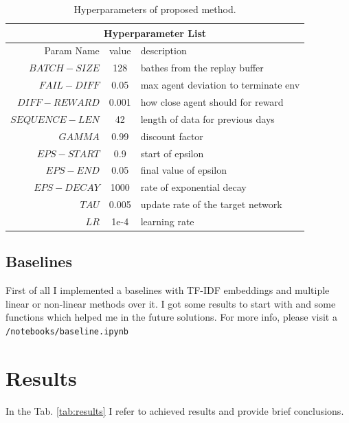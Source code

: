\documentclass{article}
\begin{document}
\begin{table}[tbh!]
\begin{center}
\begin{tabular}{ |r||c|l|  }
 \hline
 \multicolumn{3}{|c|}{Hyperparameter List} \\
 \hline
 Param Name & value & description \\
 \hline
 $BATCH-SIZE$   & 128    & bathes from the replay buffer\\
 $FAIL-DIFF$ & 0.05 & max agent deviation to terminate env\\ 
 $DIFF-REWARD$ & 0.001 & how close agent should for reward\\
 $SEQUENCE-LEN$ & 42 & length of data for previous days  \\
 $GAMMA$   & 0.99    & discount factor\\
 $EPS-START$ & 0.9    & start of epsilon\\
 $EPS-END$ &  0.05    & final value of epsilon\\
 $EPS-DECAY$ &  1000    & rate of exponential decay\\
 $TAU$ &  0.005    &update rate of the target network\\
 $LR$ &  1e-4    &learning rate\\
 \hline
\end{tabular}
\caption{Hyperparameters of proposed method.}
\label{tab:hyperparams}
\end{center}
\end{table}


\subsection{Baselines}
\label{sec:baseline}
First of all I implemented a baselines with TF-IDF embeddings and multiple linear or non-linear methods over it. 
I got some results to start with and some functions which helped me in the future solutions.
For more info, please visit a \texttt{/notebooks/baseline.ipynb}

\section{Results}
\label{sec:results}

In the Tab. \ref{tab:results} I refer to achieved results and provide brief conclusions.
\end{document}
